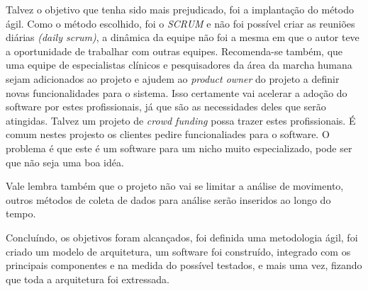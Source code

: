 Talvez o objetivo que tenha sido mais prejudicado, foi a implantação do método ágil. 
Como o método escolhido, foi o \emph{SCRUM} e não foi possível criar as reuniões diárias \emph{(daily scrum)}, a dinâmica da equipe não foi a mesma em que o autor teve a oportunidade de trabalhar com outras equipes.
Recomenda-se também, que uma equipe de especialistas clínicos e pesquisadores da área da marcha humana sejam adicionados ao projeto e ajudem ao \emph{product owner} do projeto a definir novas funcionalidades para o sistema. 
Isso certamente vai acelerar a adoção do software por estes profissionais, já que são as necessidades deles que serão atingidas.
Talvez um projeto de \emph{crowd funding} possa trazer estes profissionais. 
É comum nestes projesto os clientes pedire funcionaliades para o software.
O problema é que este é um software para um nicho muito especializado, pode ser que não seja uma boa idéa.

Vale lembra também que o projeto não vai se limitar a análise de movimento, outros métodos de coleta de dados para análise serão inseridos ao longo do tempo.


Concluíndo, os objetivos foram alcançados, foi definida uma metodologia ágil, foi criado um modelo de arquitetura, um software foi construído, integrado com os principais componentes e na medida do possível testados, e mais uma vez, fizando que toda a arquitetura foi extressada.
